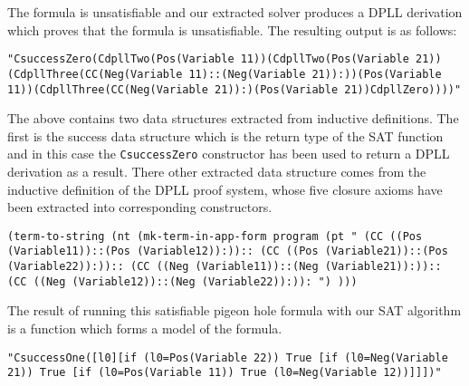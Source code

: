 The formula is unsatisfiable and our extracted solver produces a DPLL derivation which proves that the formula is unsatisfiable. The resulting output is as follows:

\begin{center}
\texttt{"CsuccessZero(CdpllTwo(Pos(Variable 11))(CdpllTwo(Pos(Variable 21))(CdpllThree(CC(Neg(Variable 11)::(Neg(Variable 21)):))(Pos(Variable 11))(CdpllThree(CC(Neg(Variable 21)):)(Pos(Variable 21))CdpllZero))))"}
\end{center}

The above contains two data structures extracted from inductive definitions. The first is the success data structure which is the return type of the SAT function and in this case the \texttt{CsuccessZero} constructor has been used to return a DPLL derivation as a result. There other extracted data structure comes from the inductive definition of the DPLL proof system, whose five closure axioms have been extracted into corresponding constructors.



\begin{center}
\texttt{(term-to-string (nt (mk-term-in-app-form program (pt "                          
(CC ((Pos (Variable11))::(Pos (Variable12)):))::                                
(CC ((Pos (Variable21))::(Pos (Variable22)):))::                                
(CC ((Neg (Variable11))::(Neg (Variable21)):))::                                
(CC ((Neg (Variable12))::(Neg (Variable22)):)):                                 
") )))}
\end{center}

The result of running this satisfiable pigeon hole formula with our SAT algorithm is a function which forms a model of the formula.

\begin{center}
\texttt{"CsuccessOne([l0][if (l0=Pos(Variable 22)) True [if (l0=Neg(Variable 21)) True [if (l0=Pos(Variable 11)) True (l0=Neg(Variable 12))]]])"}
\end{center}

\FloatBarrier
